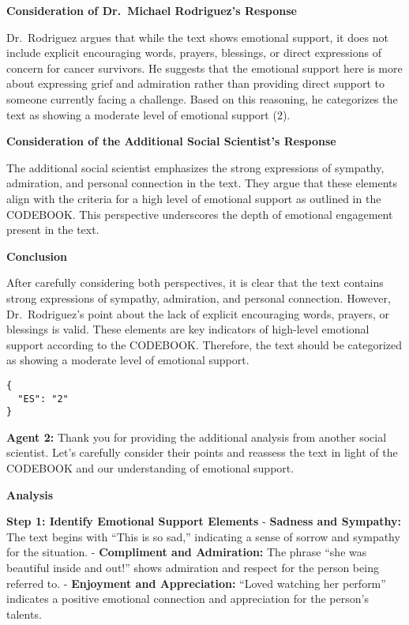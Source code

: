 \textbf{Consideration of Dr.~Michael Rodriguez's Response}

Dr.~Rodriguez argues that while the text shows emotional support, it
does not include explicit encouraging words, prayers, blessings, or
direct expressions of concern for cancer survivors. He suggests that the
emotional support here is more about expressing grief and admiration
rather than providing direct support to someone currently facing a
challenge. Based on this reasoning, he categorizes the text as showing a
moderate level of emotional support (2).

\textbf{Consideration of the Additional Social Scientist's Response}

The additional social scientist emphasizes the strong expressions of
sympathy, admiration, and personal connection in the text. They argue
that these elements align with the criteria for a high level of
emotional support as outlined in the CODEBOOK. This perspective
underscores the depth of emotional engagement present in the text.

\textbf{Conclusion}

After carefully considering both perspectives, it is clear that the text
contains strong expressions of sympathy, admiration, and personal
connection. However, Dr.~Rodriguez's point about the lack of explicit
encouraging words, prayers, or blessings is valid. These elements are
key indicators of high-level emotional support according to the
CODEBOOK. Therefore, the text should be categorized as showing a
moderate level of emotional support.

\begin{verbatim}
{
  "ES": "2"
}
\end{verbatim}

\textbf{Agent 2:} Thank you for providing the additional analysis from another
social scientist. Let's carefully consider their points and reassess the
text in light of the CODEBOOK and our understanding of emotional
support.

\textbf{Analysis}

\textbf{Step 1: Identify Emotional Support Elements} - \textbf{Sadness
and Sympathy:} The text begins with ``This is so sad,'' indicating a
sense of sorrow and sympathy for the situation. - \textbf{Compliment and
Admiration:} The phrase ``she was beautiful inside and out!'' shows
admiration and respect for the person being referred to. -
\textbf{Enjoyment and Appreciation:} ``Loved watching her perform''
indicates a positive emotional connection and appreciation for the
person's talents.

